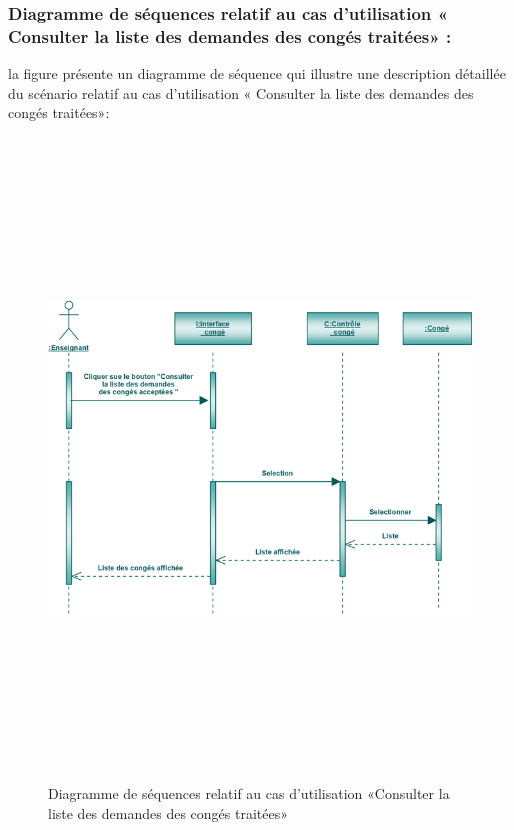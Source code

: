 \documentclass[12 pt]{report}
\begin{document}
\subsubsection{Diagramme de séquences relatif au cas d’utilisation « Consulter la liste des demandes
 des congés traitées» :}
la figure   présente un diagramme de séquence qui illustre une description détaillée du scénario relatif au cas d’utilisation « Consulter la liste des demandes
 des congés traitées»: 
\begin{figure}[h]
 \begin{center}
\includegraphics[width= 18 cm ,height=  17cm]{scct.PNG}
\caption{Diagramme de séquences relatif au cas d’utilisation «Consulter la liste des demandes
 des congés traitées»}

\end{center}
\end{figure}
\end{document}

